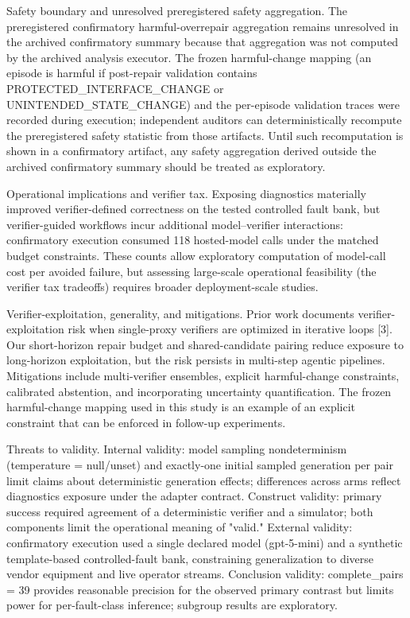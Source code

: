\documentclass[conference]{IEEEtran}
\begin{document}
Safety boundary and unresolved preregistered safety aggregation. The preregistered confirmatory harmful-overrepair aggregation remains unresolved in the archived confirmatory summary because that aggregation was not computed by the archived analysis executor. The frozen harmful-change mapping (an episode is harmful if post-repair validation contains PROTECTED\_INTERFACE\_CHANGE or UNINTENDED\_STATE\_CHANGE) and the per-episode validation traces were recorded during execution; independent auditors can deterministically recompute the preregistered safety statistic from those artifacts. Until such recomputation is shown in a confirmatory artifact, any safety aggregation derived outside the archived confirmatory summary should be treated as exploratory.

Operational implications and verifier tax. Exposing diagnostics materially improved verifier-defined correctness on the tested controlled fault bank, but verifier-guided workflows incur additional model--verifier interactions: confirmatory execution consumed 118 hosted-model calls under the matched budget constraints. These counts allow exploratory computation of model-call cost per avoided failure, but assessing large-scale operational feasibility (the verifier tax tradeoffs) requires broader deployment-scale studies.

Verifier-exploitation, generality, and mitigations. Prior work documents verifier-exploitation risk when single-proxy verifiers are optimized in iterative loops [3]. Our short-horizon repair budget and shared-candidate pairing reduce exposure to long-horizon exploitation, but the risk persists in multi-step agentic pipelines. Mitigations include multi-verifier ensembles, explicit harmful-change constraints, calibrated abstention, and incorporating uncertainty quantification. The frozen harmful-change mapping used in this study is an example of an explicit constraint that can be enforced in follow-up experiments.

Threats to validity. Internal validity: model sampling nondeterminism (temperature = null/unset) and exactly-one initial sampled generation per pair limit claims about deterministic generation effects; differences across arms reflect diagnostics exposure under the adapter contract. Construct validity: primary success required agreement of a deterministic verifier and a simulator; both components limit the operational meaning of "valid." External validity: confirmatory execution used a single declared model (gpt-5-mini) and a synthetic template-based controlled-fault bank, constraining generalization to diverse vendor equipment and live operator streams. Conclusion validity: complete\_pairs = 39 provides reasonable precision for the observed primary contrast but limits power for per-fault-class inference; subgroup results are exploratory.
\end{document}
